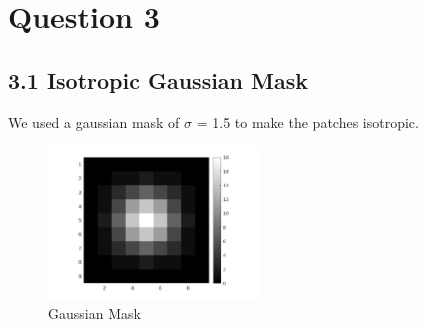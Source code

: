 \documentclass[12pt, a4paper]{article}
\begin{document}
\vspace*{-22pt}
\section*{Question 3}
\subsection*{3.1 Isotropic Gaussian Mask}
We used a gaussian mask of $\sigma$ = 1.5 to make the patches isotropic.
\renewcommand{\thefigure}{3.1}
\begin{figure}[h]
    \centering
    \vspace*{-15pt}
    \includegraphics[width=0.5\textwidth]{isotropic_filter.png}
    \vspace*{-15pt}
    \caption{Gaussian Mask}
    \label{fig:2.6}
\end{figure}
\end{document}
